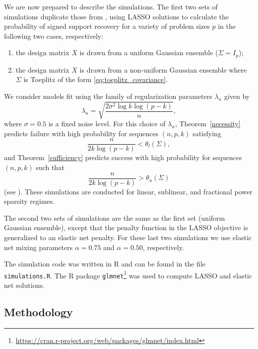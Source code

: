 \documentclass[letterpaper,12pt]{article}
\begin{document}
We are now prepared to describe the simulations. The first two sets of
simulations duplicate those from \cite{wainwright06}, using LASSO
solutions to calculate the probability of signed support recovery for
a variety of problem sizes $p$ in the following two cases,
respectively:
\begin{enumerate}
\item the design matrix $X$ is drawn from a uniform Gaussian ensemble
  ($\Sigma = I_p$);
\item the design matrix $X$ is drawn from a non-uniform Gaussian
  ensemble where $\Sigma$ is Toeplitz of the form
  \eqref{eq:toeplitz_covariance}.
\end{enumerate}
We consider models fit using the family of regularization parameters
$\lambda_n$ given by
\begin{equation*}
  \lambda_n = \sqrt{\frac{2\sigma^2 \log k \log(p - k)}{n}},
\end{equation*}
where $\sigma = 0.5$ is a fixed noise level. For this choice of
$\lambda_n$, Theorem~\ref{necessity} predicts failure with high
probability for sequences $(n, p, k)$ satisfying
\begin{equation*}
  \frac{n}{2k \log(p - k)} < \theta_l(\Sigma),
\end{equation*}
and Theorem~\ref{sufficiency} predicts success with high probability
for sequences $(n, p, k)$ such that
\begin{equation*}
  \frac{n}{2k \log(p - k)} > \theta_u(\Sigma)
\end{equation*}
(see \cite{wainwright06}). These simulations are conducted for linear,
sublinear, and fractional power sparsity regimes.

The second two sets of simulations are the same as the first set
(uniform Gaussian ensemble), except that the penalty function in the
LASSO objective is generalized to an elastic net penalty. For these
last two simulations we use elastic net mixing parameters
$\alpha = 0.75$ and $\alpha = 0.50$, respectively.

The simulation code was written in R and can be found in the file
\texttt{simulations.R}. The R package
\texttt{glmnet}\footnote{\url{https://cran.r-project.org/web/packages/glmnet/index.html}}
was used to compute LASSO and elastic net solutions.

\subsection*{Methodology}
\end{document}
